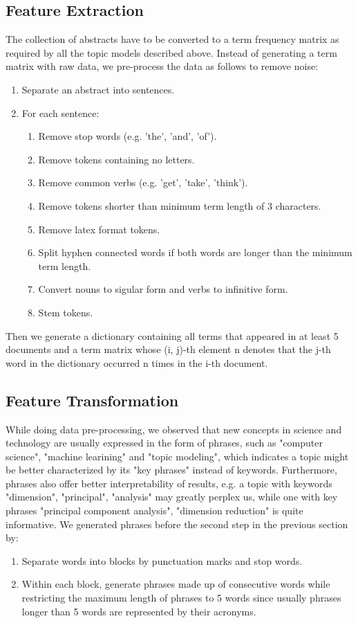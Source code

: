 \documentclass[DIV=calc, paper=letter, fontsize=10pt, twocolumn]{scrartcl}	 %
\begin{document}
\subsection*{Feature Extraction}
The collection of abstracts have to be converted to a term frequency matrix as required by all the topic models described above. Instead of generating a term matrix with raw data, we pre-process the data as follows to remove noise:
\begin{enumerate}
  \item Separate an abstract into sentences.
  \item For each sentence:
    	\begin{enumerate}
  	  	\item Remove stop words (e.g. 'the', 'and', 'of').
		\item Remove tokens containing no letters.
		\item Remove common verbs (e.g. 'get', 'take', 'think').
		\item Remove tokens shorter than minimum term length of 3 characters.
		\item Remove latex format tokens.
		\item Split hyphen connected words if both words are longer than the minimum term length.
		\item Convert nouns to sigular form and verbs to infinitive form.
		\item Stem tokens.
  	\end{enumerate}
\end{enumerate}
Then we generate a dictionary containing all terms that appeared in at least 5 documents and a term matrix whose (i, j)-th element n denotes that the j-th word in the dictionary occurred n times in the i-th document. 
 
\subsection*{Feature Transformation}
While doing data pre-processing, we observed that new concepts in science and technology are usually expressed in the form of phrases, such as "computer science", "machine learining" and "topic modeling", which indicates a topic might be better characterized by its "key phrases" instead of keywords. Furthermore, phrases also offer better interpretability of results, e.g. a topic with keywords {"dimension", "principal", "analysis"} may greatly perplex us, while one with key phrases {"principal component analysis", "dimension reduction"} is quite informative.\newline
We generated phrases before the second step in the previous section by:
\begin{enumerate}
  \item Separate words into blocks by punctuation marks and stop words.
  \item Within each block, generate phrases made up of consecutive words while restricting the maximum length of phrases to 5 words since usually phrases longer than 5 words are represented by their acronyms.
\end{enumerate}
\end{document}
